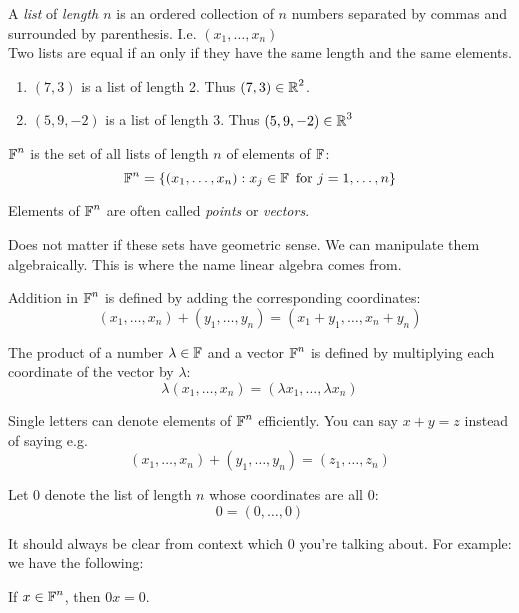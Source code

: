 \begin{definition}
    A \textit{list} of \textit{length $n$} is an ordered collection of $n$ numbers
    separated by commas and surrounded by parenthesis. I.e. $(x_1, \ldots, x_n)$
    \\
    Two lists are equal if an only if they have the same length and the same elements. 
\end{definition}


\begin{enumerate}
    \item $(7, 3)$ is a list of length 2. Thus $(7, 3) \in \operatorname{\mathbb{R}}^2$.
    \item $(5, 9, -2)$ is a list of length 3. Thus $(5, 9, -2) \in \operatorname{\mathbb{R}}^3$
\end{enumerate}

\begin{definition}
    $\operatorname{\mathbb{F}}^n$ is the set of all lists of length $n$ of elements of $\operatorname{\mathbb{F}}$:
    \[ \operatorname{\mathbb{F}}^n = \{(x_1, \ldots, x_n) : x_j \in \operatorname{\mathbb{F}} \text{ for } j = 1, \ldots, n\} \]
\end{definition}

Elements of $\operatorname{\mathbb{F}}^n$ are often called \textit{points} or \textit{vectors}. 

Does not matter if these sets have geometric sense. We can manipulate them algebraically.
This is where the name linear algebra comes from.

\begin{definition}
    Addition in $\operatorname{\mathbb{F}}^n$ is defined by adding the corresponding coordinates:
    \[ (x_1, \ldots, x_n) + (y_1, \ldots, y_n) = (x_1+y_1, \ldots, x_n+y_n) \]
\end{definition}

\begin{definition}
    The product of a number $\lambda \in \operatorname{\mathbb{F}}$ and a vector $\operatorname{\mathbb{F}}^n$ is defined by
    multiplying each coordinate of the vector by $\lambda$:
    \[\lambda (x_1, \ldots, x_n) = (\lambda x_1, \ldots, \lambda x_n) \] 
\end{definition}

Single letters can denote elements of $\operatorname{\mathbb{F}}^n$ efficiently. You can say $x + y = z$ instead of saying e.g.
\[ (x_1, \ldots, x_n) + (y_1, \ldots, y_n) = (z_1, \ldots, z_n) \]

\begin{definition}
    Let 0 denote the list of length $n$ whose coordinates are all 0:
    \[ 0 = (0, \ldots, 0) \]
\end{definition}

It should always be clear from context which 0 you're talking about. For example:
we have the following:
\begin{theorem}
    If $x \in \operatorname{\mathbb{F}}^n$, then $0x = 0$.
\end{theorem}

